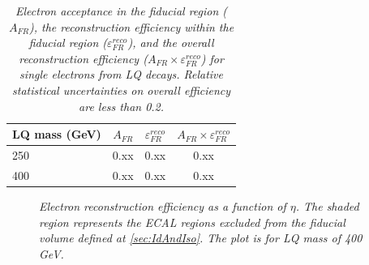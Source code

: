 \begin{table}[htb]
  \label{tab:ElecEffAcc}
  \begin{center}
    \begin{tabular}{|l|c|c|c|} \hline
      LQ mass (GeV) & $A_{FR}$ & $\varepsilon_{FR}^{reco}$ & $A_{FR} \times \varepsilon_{FR}^{reco}$\\ \hline
      250 & 0.xx & 0.xx & 0.xx \\ \hline
      400 & 0.xx & 0.xx & 0.xx \\ \hline
    \end{tabular}
    \caption{\small \sl Electron acceptance in the fiducial region ($A_{FR}$), the 
      reconstruction efficiency within the fiducial region ($\varepsilon_{FR}^{reco}$), and the overall reconstruction efficiency 
      ($A_{FR} \times \varepsilon_{FR}^{reco}$) for single electrons from LQ decays.   Relative statistical uncertainties on overall 
      efficiency are less than 0.2.  %
      } 
  \end{center}
\end{table}

\begin{figure}
  \begin{center}
    \caption{\small \sl Electron reconstruction efficiency as a function of $\eta$. The shaded region represents the  
      ECAL regions excluded from the fiducial volume defined at \ref{sec:IdAndIso}. The plot is for LQ mass of 400 GeV.}
    \label{fig:elecEffFV}
  \end{center}
\end{figure}

